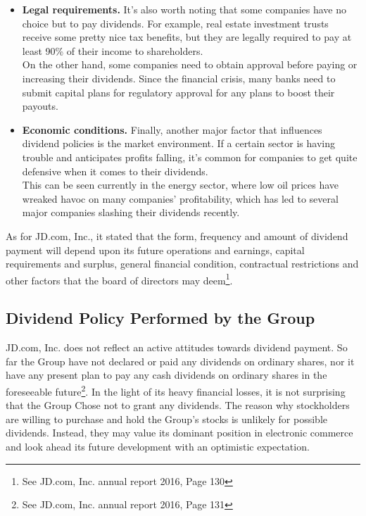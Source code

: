 \begin{itemize}
	\item \textbf{Legal requirements.} 
	It's also worth noting that some companies have no choice but to pay dividends. For example, real estate investment trusts receive some pretty nice tax benefits, but they are legally required to pay at least 90\% of their income to shareholders.\\
	On the other hand, some companies need to obtain approval before paying or increasing their dividends. Since the financial crisis, many banks need to submit capital plans for regulatory approval for any plans to boost their payouts.
	
	\item \textbf{Economic conditions.}
	Finally, another major factor that influences dividend policies is the market environment. If a certain sector is having trouble and anticipates profits falling, it's common for companies to get quite defensive when it comes to their dividends.\\	
	This can be seen currently in the energy sector, where low oil prices have wreaked havoc on many companies' profitability, which has led to several major companies slashing their dividends recently.
\end{itemize}

As for JD.com, Inc., it stated that the form, frequency and amount of dividend payment will depend upon its future operations and earnings, capital requirements and surplus, general financial condition, contractual restrictions and other factors that the board of directors may deem\footnote{See JD.com, Inc. annual report 2016, Page 130}.


\subsection{Dividend Policy Performed by the Group}
JD.com, Inc. does not reflect an active attitudes towards dividend payment. So far the Group have not declared or paid any dividends on ordinary shares, nor it have any present plan to pay any cash dividends on ordinary shares in the foreseeable future\footnote{See JD.com, Inc. annual report 2016, Page 131}. In the light of its heavy financial losses, it is not surprising that the Group Chose not to grant any dividends. The reason why stockholders are willing to purchase and hold the Group's stocks is unlikely for possible dividends. Instead, they may value its dominant position in electronic commerce and look ahead its future development with an optimistic expectation.


